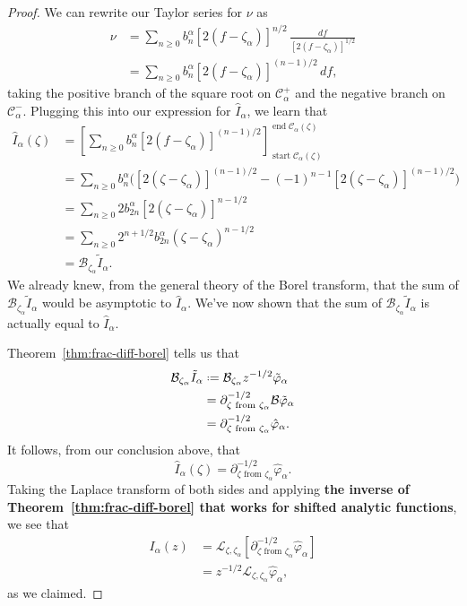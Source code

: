 \documentclass{article}
\theoremstyle{definition}
\newcommand*{\defeq}{\mathrel{\vcenter{\baselineskip0.5ex \lineskiplimit0pt
                     \hbox{\scriptsize.}\hbox{\scriptsize.}}}%
                     =}
\newcommand{\laplace}{\mathcal{L}}
\newcommand{\borel}{\mathcal{B}}
\begin{document}
\begin{proof}
We can rewrite our Taylor series for $\nu$ as
\begin{align*}
\nu & = \sum_{n \ge 0} b_n^\alpha [2(f - \zeta_\alpha)]^{n/2}\,\frac{df}{[2(f - \zeta_\alpha)]^{1/2}} \\
& = \sum_{n \ge 0} b_n^\alpha [2(f - \zeta_\alpha)]^{(n - 1)/2}\,df,
\end{align*}
taking the positive branch of the square root on $\mathcal{C}^+_\alpha$ and the negative branch on $\mathcal{C}^-_\alpha$. Plugging this into our expression for $\hat{I}_\alpha$, we learn that
\begin{align*}
\hat{I}_\alpha(\zeta) & = \left[ \sum_{n \ge 0} b_n^\alpha [2(f - \zeta_\alpha)]^{(n - 1)/2} \right]_{\operatorname{start} \mathcal{C}_\alpha(\zeta)}^{\operatorname{end} \mathcal{C}_\alpha(\zeta)} \\
& = \sum_{n \ge 0} b_n^\alpha \Big( [2(\zeta - \zeta_\alpha)]^{(n - 1)/2} - (-1)^{n-1}[2(\zeta - \zeta_\alpha)]^{(n - 1)/2} \Big) \\
& = \sum_{n \ge 0} 2 b_{2n}^\alpha [2(\zeta - \zeta_\alpha)]^{n - 1/2} \\
& = \sum_{n \ge 0} 2^{n+1/2} b_{2n}^\alpha (\zeta - \zeta_\alpha)^{n - 1/2} \\
& = \borel_{\zeta_\alpha} \tilde{I}_\alpha.
\end{align*}
We already knew, from the general theory of the Borel transform, that the sum of $\borel_{\zeta_\alpha} \tilde{I}_\alpha$ would be asymptotic to $\hat{I}_\alpha$. We've now shown that the sum of $\borel_{\zeta_\alpha} \tilde{I}_\alpha$ is actually equal to $\hat{I}_\alpha$.

Theorem~\ref{thm:frac-diff-borel} tells us that
\begin{align*}
\borel_{\zeta_\alpha} \tilde{I}_\alpha & \defeq \borel_{\zeta_\alpha} z^{-1/2} \tilde{\varphi}_\alpha \\
& = \partial^{-1/2}_{\zeta \text{ from } \zeta_\alpha} \borel \tilde{\varphi}_\alpha \\
& = \partial^{-1/2}_{\zeta \text{ from } \zeta_\alpha} \hat{\varphi}_\alpha.
\end{align*}
It follows, from our conclusion above, that
\begin{equation}\label{shifted-resum-valid}
\hat{I}_\alpha(\zeta) = \partial^{-1/2}_{\zeta \text{ from } \zeta_\alpha} \hat{\varphi}_\alpha.
\end{equation}
Taking the Laplace transform of both sides and applying \textbf{the inverse of Theorem~\ref{thm:frac-diff-borel} that works for shifted analytic functions}, we see that
\begin{align*}
I_\alpha(z) & = \laplace_{\zeta, \zeta_\alpha} \left[ \partial^{-1/2}_{\zeta \text{ from } \zeta_\alpha} \hat{\varphi}_\alpha \right] \\
& = z^{-1/2} \laplace_{\zeta, \zeta_\alpha} \hat{\varphi}_\alpha,
\end{align*}
as we claimed.


\end{proof}
\end{document}
